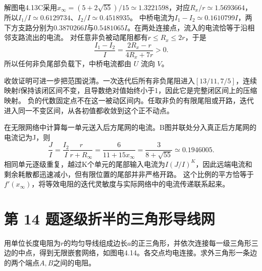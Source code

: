 \documentclass[UTF8,fontset=fandol,a4paper,11pt]{ctexart}
\newcommand{\figcaption}[1]{\par\vspace{2pt}{\small\color{muted}#1}\par}
\begin{document}
解图电4.13C采用$x_\infty=(5+2\sqrt{55})/15\simeq1.3221598$，对应$R_x/r\simeq1.5693664$，所以$I_1/I\simeq0.6129734$、$I_2/I\simeq0.4518935$。
中桥电流为$I_1-I_2\simeq0.1610799I$，两下方支路分别为$0.3870266I$与$0.5481065I$。在两处连接点，流入的电流恰等于沿相邻支路流出的电流。
对任意非负被动尾阻都有$r\le R_x\le2r$，于是
\[
\frac{I_1-I_2}{I}=\frac{2R_x-r}{4R_x+7r}>0.
\]
所以任何非负尾部负载下，中桥电流都由 $U$ 流向 $V$。

收敛证明可进一步把范围说清。一次迭代后所有非负尾阻进入$[13/11,7/5]$，连续映射f保持该闭区间不变，且导数绝对值始终小于1，因此它是完整闭区间上的压缩映射。
负的代数固定点不在这一被动区间内。任取非负的有限尾阻或开路，迭代进入同一不变区间，从各初值都收敛到这个正不动点。

在无限网络中计算每一单元送入后方尾网的电流。B图并联处分入真正后方尾网的电流记为J，则
\[
\frac JI=\frac{I_2}{I}\frac{r}{r+R_\infty}
=\frac6{11+15x_\infty}=\frac3{8+\sqrt{55}}\simeq0.1946005.
\]
相同单元逐级重复，越过K个单元的尾部输入电流为$I(J/I)^K$，因此远端电流和剩余耗散都迅速减小，但有限位置的尾部并非严格开路。
这个比例的平方恰等于$f'(x_\infty)$，将等效电阻的迭代灵敏度与实际网络中的电流传递联系起来。




\section*{第 14 题\quad 逐级折半的三角形导线网}\label{q:14}

用单位长度电阻为$r$的均匀导线组成边长$a$的正三角形，并依次连接每一级三角形三边的中点，得到无限嵌套网络，如图电4.14。各交点均电连接。求外三角形一条边的两个端点$A,B$之间的电阻。

\begin{center}\begin{minipage}{.98\linewidth}\centering
{}
\figcaption{图电4.14\quad 中点三角形继续无限嵌套}
\end{minipage}\end{center}
\end{document}

